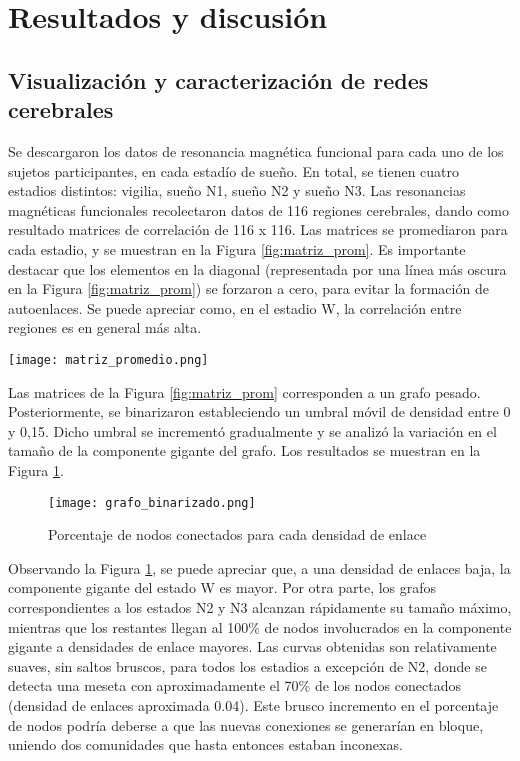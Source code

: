 \documentclass[a4paper,10pt,twocolumn,spanish]{article}
\begin{document}
\section{Resultados y discusión}

\subsection{Visualización y caracterización de redes cerebrales}

Se descargaron los datos de resonancia magnética funcional para cada uno de los sujetos participantes, en cada estadío de sueño. En total, se tienen cuatro estadios distintos: vigilia, sueño N1, sueño N2 y sueño N3. Las resonancias magnéticas funcionales recolectaron datos de 116 regiones cerebrales, dando como resultado matrices de correlación de 116 x 116. Las matrices se promediaron para cada estadio, y se muestran en la Figura \ref{fig:matriz_prom}.  Es importante destacar que los elementos en la diagonal (representada por una línea más oscura en la Figura \ref{fig:matriz_prom}) se forzaron a cero, para evitar la formación de autoenlaces. Se puede apreciar como, en el estadio W, la correlación entre regiones es en general más alta.

\begin{figure*}[hbt]
\centering
\texttt{[image: matriz\_promedio.png]}
\caption{Matrices de correlación promedio para cada estadio cerebral}
\label{fig:matriz_prom}
\end{figure*}

Las matrices de la Figura \ref{fig:matriz_prom} corresponden a un grafo pesado. Posteriormente, se binarizaron estableciendo un umbral móvil de densidad entre 0 y 0,15. Dicho umbral se incrementó gradualmente y se analizó la variación en el tamaño de la componente gigante del grafo. Los resultados se muestran en la Figura \ref{fig:comp_gigante}.

\begin{figure}[htb]
\centering
\texttt{[image: grafo\_binarizado.png]}
\caption{Porcentaje de nodos conectados para cada densidad de enlace}
\label{fig:comp_gigante}
\end{figure}

Observando la Figura \ref{fig:comp_gigante}, se puede apreciar que, a una densidad de enlaces baja, la componente gigante del estado W es mayor. Por otra parte, los grafos correspondientes a los estados N2 y N3 alcanzan rápidamente su tamaño máximo, mientras que los restantes llegan al 100\% de nodos involucrados en la componente gigante a densidades de enlace mayores. Las curvas obtenidas son relativamente suaves, sin saltos bruscos, para todos los estadios a excepción de N2, donde se detecta una meseta con aproximadamente el 70\% de los nodos conectados (densidad de enlaces aproximada 0.04). Este brusco incremento en el porcentaje de nodos podría deberse a que las nuevas conexiones se generarían en bloque, uniendo dos comunidades que hasta entonces estaban inconexas.
\end{document}
